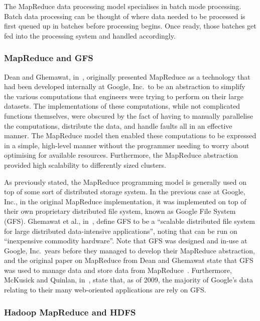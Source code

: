 \documentclass[a4paper,11pt]{article}
\begin{document}
The MapReduce data processing model specialises in batch mode processing. Batch data processing can be thought of where
data needed to be processed is first queued up in batches before processing begins. Once ready, those batches get fed
into the processing system and handled accordingly. %

\subsubsection{MapReduce and GFS} %
\label{ssub:mapreduce_and_gfs}

Dean and Ghemawat, in~\cite{dean_mapreduce:_2008}, originally presented MapReduce as a technology that had been
developed internally at Google, Inc.\ to be an abstraction to simplify the various computations that engineers were
trying to perform on their large datasets. The implementations of these computations, while not complicated functions
themselves, were obscured by the fact of having to manually parallelise the computations, distribute the data, and
handle faults all in an effective manner. The MapReduce model then enabled these computations to be expressed in a
simple, high-level manner without the programmer needing to worry about optimising for available resources. Furthermore,
the MapReduce abstraction provided high scalability to differently sized clusters.

As previously stated, the MapReduce programming model is generally used on top of some sort of distributed storage
system. In the previous case at Google, Inc., in the original MapReduce implementation, it was implemented on top of
their own proprietary distributed file system, known as Google File System (GFS). Ghemawat et al.,
in~\cite{ghemawat_google_2003}, define GFS to be a ``scalable distributed file system for large distributed data-intensive
applications'', noting that can be run on ``inexpensive commodity hardware''. Note that GFS was designed and in-use
at Google, Inc.\ years before they managed to develop their MapReduce abstraction, and the original paper on MapReduce
from Dean and Ghemawat state that GFS was used to manage data and store data from MapReduce~\cite{dean_mapreduce:_2008}.
Furthermore, McKusick and Quinlan, in~\cite{mckusick2009gfs}, state that, as of 2009, the majority of Google's data
relating to their many web-oriented applications are rely on GFS.



\subsubsection{Hadoop MapReduce and HDFS} %
\label{ssub:hadoop_mapreduce_and_hdfs}
\end{document}
